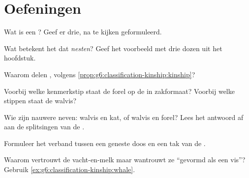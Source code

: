 \section{Oefeningen}

\begin{exercise}[$\star$]\label{exo:g6:classification-kinship:1}
Wat is een ? Geef er drie, na te kijken geformuleerd.
\end{exercise}

\begin{exercise}[$\star$]\label{exo:g6:classification-kinship:2}
Wat betekent het dat  \emph{nesten}? Geef het voorbeeld met drie
dozen uit het hoofdstuk.
\end{exercise}

\begin{exercise}[$\star$]\label{exo:g6:classification-kinship:3}
Waarom delen  , volgens
\cref{prop:g6:classification-kinship:kinship}?
\end{exercise}

\begin{exercise}[$\star$]\label{exo:g6:classification-kinship:4}
Voorbij welke kenmerkstip staat de forel op de  in zakformaat?
Voorbij welke stippen staat de walvis?
\end{exercise}

\begin{exercise}[$\star$]\label{exo:g6:classification-kinship:5}
Wie zijn nauwere neven: walvis en kat, of walvis en forel? Lees het
antwoord af aan de splitsingen van de .
\end{exercise}

\begin{exercise}[$\star$]\label{exo:g6:classification-kinship:6}
Formuleer het verband tussen een geneste doos en een tak van de .
\end{exercise}

\begin{exercise}[$\star\star$]\label{exo:g6:classification-kinship:7}
Waarom vertrouwt de  vacht-en-melk maar wantrouwt ze
``gevormd als een vis''? Gebruik
\cref{ex:g6:classification-kinship:whale}.
\end{exercise}

